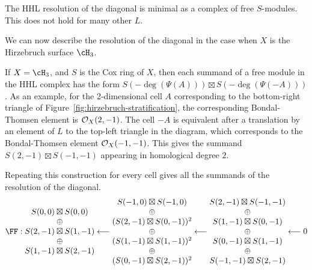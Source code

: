 \documentclass{amsart}
\begin{document}
\begin{remark}
 The HHL resolution of the diagonal is minimal as a complex of free $S$-modules. This does not hold for many other $L$.
\end{remark}


We can now describe the resolution of the diagonal in the case when $X$ is the  Hirzebruch surface $\cH_{3}$. 
\begin{example}
  If $X=\cH_3$, and  $S$ is the Cox ring of $X$, then each summand of a free module in the HHL complex has the form $S(-\deg(\Psi(A)))\boxtimes S(-\deg(\Psi(-A)))$. As an example, for the 2-dimensional cell $A$ corresponding to the bottom-right triangle of Figure~\ref{fig:hirzebruch-stratification}, the corresponding Bondal-Thomsen element is ${\mathcal O}_X(2,-1)$. The cell $-A$ is equivalent after a translation by an element of $L$ to the top-left triangle in the diagram, which corresponds to the Bondal-Thomsen element ${\mathcal O}_X(-1,-1)$. This gives the summand $S(2,-1)\boxtimes S(-1,-1)$ appearing in homological degree $2$. 

  Repeating this construction for every cell gives all the summands of the resolution of the diagonal.
  \[
   \FF : \begin{matrix}
    S(0,0)\boxtimes S(0,0)\\
    \oplus\\
    S(2,-1)\boxtimes S(1,-1)\\
    \oplus\\
    S(1,-1)\boxtimes S(2,-1)\\
  \end{matrix}\longleftarrow
  \begin{matrix}
    S(-1,0)\boxtimes S(-1,0)\\
    \oplus\\
    (S(2,-1)\boxtimes S(0,-1))^2\\
    \oplus\\
    (S(1,-1)\boxtimes S(1,-1))^2\\
    \oplus\\
    (S(0,-1)\boxtimes S(2,-1))^2\\
  \end{matrix}
  \longleftarrow
  \begin{matrix}
    S(2,-1)\boxtimes S(-1,-1)\\
    \oplus\\
    S(1,-1)\boxtimes S(0,-1)\\
    \oplus\\
    S(0,-1)\boxtimes S(1,-1)\\
    \oplus\\
    S(-1,-1)\boxtimes S(2,-1)\\
  \end{matrix}
  \longleftarrow 0
  \]
\end{example}
\end{document}
